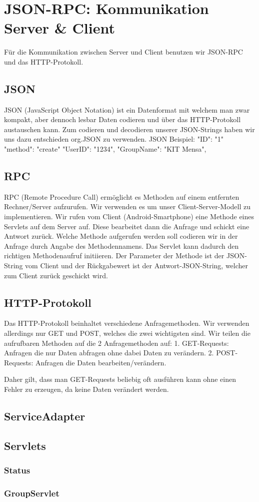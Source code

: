 
\section{JSON-RPC: Kommunikation Server \& Client}
Für die Kommunikation zwischen Server und Client benutzen wir JSON-RPC und das HTTP-Protokoll.

\subsection{JSON}
JSON (JavaScript Object Notation) ist ein Datenformat mit welchem man zwar kompakt, aber dennoch lesbar Daten codieren und über das HTTP-Protokoll austauschen kann.
Zum codieren und decodieren unserer JSON-Strings haben wir uns dazu entschieden org.JSON zu verwenden.
JSON Beispiel:
{
  "ID": "1"
  "method": "create"	
  "UserID": "1234",
  "GroupName": "KIT Mensa",
}

\subsection{RPC}
RPC (Remote Procedure Call) ermöglicht es Methoden auf einem entfernten Rechner/Server aufzurufen. Wir verwenden es um unser Client-Server-Modell zu implementieren.
Wir rufen vom Client (Android-Smartphone) eine Methode eines Servlets auf dem Server auf. Diese bearbeitet dann die Anfrage und schickt eine Antwort zurück.
Welche Methode aufgerufen werden soll codieren wir in der Anfrage durch Angabe des Methodennamens. Das Servlet kann dadurch den richtigen Methodenaufruf initiieren.
Der Parameter der Methode ist der JSON-String vom Client und der Rückgabewert ist der Antwort-JSON-String, welcher zum Client zurück geschickt wird.


\subsection{HTTP-Protokoll}
Das HTTP-Protokoll beinhaltet verschiedene Anfragemethoden.
Wir verwenden allerdings nur GET und POST, welches die zwei wichtigsten sind.
Wir teilen die aufrufbaren Methoden auf die 2 Anfragemethoden auf:
1. GET-Requests: Anfragen die nur Daten abfragen ohne dabei Daten zu verändern.
2. POST-Requests: Anfragen die Daten bearbeiten/verändern.

Daher gilt, dass man GET-Requests beliebig oft ausführen kann ohne einen Fehler zu erzeugen, da keine Daten verändert werden.

	\subsection{ServiceAdapter}
	\subsection{Servlets}
	\subsubsection{Status}
	\subsubsection{GroupServlet}
	\newpage